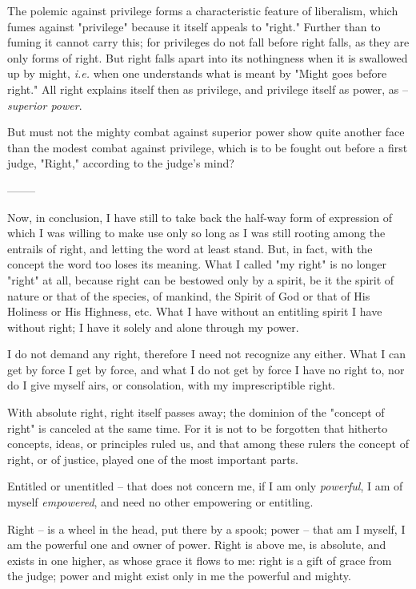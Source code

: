\documentclass[a4paper]{book}
\begin{document}
The polemic against privilege forms a characteristic feature of liberalism, 
which fumes against "{}privilege"{} because it itself appeals to "{}right."{} 
Further than to fuming it cannot carry this; for privileges do not fall before 
right falls, as they are only forms of right. But right falls apart into its 
nothingness when it is swallowed up by might, \textit{i.e.} when one 
understands what is meant by "{}Might goes before right."{} All right explains 
itself then as privilege, and privilege itself as power, as -- 
\textit{superior power}.

But must not the mighty combat against superior power show quite another face 
than the modest combat against privilege, which is to be fought out before a 
first judge, "{}Right,"{} according to the judge's mind?

\begin{center}
--------\end{center}


Now, in conclusion, I have still to take back the half-way form of expression 
of which I was willing to make use only so long as I was still rooting among 
the entrails of right, and letting the word at least stand. But, in fact, with 
the concept the word too loses its meaning. What I called "{}my right"{} is no 
longer "{}right"{} at all, because right can be bestowed only by a spirit, be 
it the spirit of nature or that of the species, of mankind, the Spirit of God 
or that of His Holiness or His Highness, etc. What I have without an entitling 
spirit I have without right; I have it solely and alone through my power.

I do not demand any right, therefore I need not recognize any either. What I 
can get by force I get by force, and what I do not get by force I have no 
right to, nor do I give myself airs, or consolation, with my imprescriptible 
right.

With absolute right, right itself passes away; the dominion of the "{}concept 
of right"{} is canceled at the same time. For it is not to be forgotten that 
hitherto concepts, ideas, or principles ruled us, and that among these rulers 
the concept of right, or of justice, played one of the most important parts.

Entitled or unentitled -- that does not concern me, if I am only 
\textit{powerful}, I am of myself \textit{empowered}, and need no other 
empowering or entitling.

Right -- is a wheel in the head, put there by a spook; power -- that am I 
myself, I am the powerful one and owner of power. Right is above me, is 
absolute, and exists in one higher, as whose grace it flows to me: right is a 
gift of grace from the judge; power and might exist only in me the powerful 
and mighty.
\end{document}
